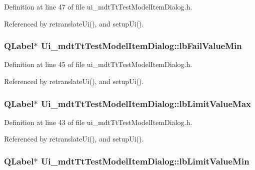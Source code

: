 Definition at line 47 of file ui\-\_\-mdt\-Tt\-Test\-Model\-Item\-Dialog.\-h.



Referenced by retranslate\-Ui(), and setup\-Ui().

\hypertarget{class_ui__mdt_tt_test_model_item_dialog_a55bd0bb0a250181fb20ed1b95f9f053d}{
\subsubsection[{lb\-Fail\-Value\-Min}]{\setlength{\rightskip}{0pt plus 5cm}Q\-Label$\ast$ Ui\-\_\-mdt\-Tt\-Test\-Model\-Item\-Dialog\-::lb\-Fail\-Value\-Min}}\label{class_ui__mdt_tt_test_model_item_dialog_a55bd0bb0a250181fb20ed1b95f9f053d}


Definition at line 45 of file ui\-\_\-mdt\-Tt\-Test\-Model\-Item\-Dialog.\-h.



Referenced by retranslate\-Ui(), and setup\-Ui().

\hypertarget{class_ui__mdt_tt_test_model_item_dialog_a7ae569a76e9b639a46323af0c9bae83b}{
\subsubsection[{lb\-Limit\-Value\-Max}]{\setlength{\rightskip}{0pt plus 5cm}Q\-Label$\ast$ Ui\-\_\-mdt\-Tt\-Test\-Model\-Item\-Dialog\-::lb\-Limit\-Value\-Max}}\label{class_ui__mdt_tt_test_model_item_dialog_a7ae569a76e9b639a46323af0c9bae83b}


Definition at line 43 of file ui\-\_\-mdt\-Tt\-Test\-Model\-Item\-Dialog.\-h.



Referenced by retranslate\-Ui(), and setup\-Ui().

\hypertarget{class_ui__mdt_tt_test_model_item_dialog_a0f8d45555f16f0c6d55d0aa1f50d194a}{
\subsubsection[{lb\-Limit\-Value\-Min}]{\setlength{\rightskip}{0pt plus 5cm}Q\-Label$\ast$ Ui\-\_\-mdt\-Tt\-Test\-Model\-Item\-Dialog\-::lb\-Limit\-Value\-Min}}\label{class_ui__mdt_tt_test_model_item_dialog_a0f8d45555f16f0c6d55d0aa1f50d194a}



